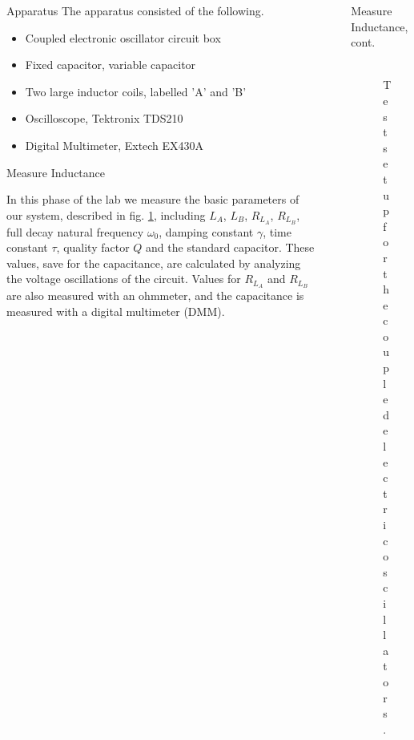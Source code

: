 \documentclass[final]{beamer}
\newlength{\sepwid}
\newlength{\onecolwid}
\begin{document}
\begin{frame}[t]
\begin{columns}[t]
\begin{column}{\onecolwid}
\begin{block}{Apparatus}
The apparatus consisted of the following.
\begin{itemize}
	\item Coupled electronic oscillator circuit box
	\item Fixed capacitor, variable capacitor
	\item Two large inductor coils, labelled 'A' and 'B'
	\item Oscilloscope, Tektronix TDS210 
	\item Digital Multimeter, Extech EX430A
\end{itemize}

\end{block}

\begin{block}{Measure Inductance}

	In this phase of the lab we measure the basic parameters of our system, described
	in fig. \ref{setup}, including $L_A$, $L_B$, $R_L_A$, $R_L_B$, full decay natural 
	frequency $\omega_0$, damping constant $\gamma$, time constant $\tau$, 
	quality factor $Q$ and the standard capacitor. These values, save for the capacitance,
	are calculated by analyzing the voltage oscillations of the circuit. Values for $R_L_A$
	and $R_L_B$ are also measured with an ohmmeter, and the capacitance is measured
	with a digital multimeter (DMM). \\

\end{block}

\end{column}
  

    \begin{column}{\sepwid}\end{column}			%
    \begin{column}{\onecolwid}					  %

\begin{block}{Measure Inductance, cont.}

	\begin{alertblock}{ }
	\begin{figure}[h]
	\includegraphics[width=0.85\textwidth]{../Images/l6_setup.png}
	\caption{\label{setup} Test setup for the coupled electric oscillators.}
	\end{figure}
	\end{alertblock}


\end{block}
\end{column}
\end{columns}
\end{frame}
\end{document}
